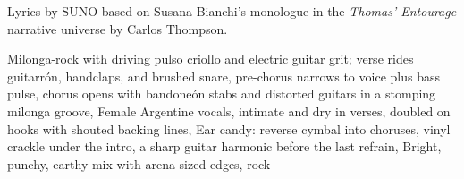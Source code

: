 
\begin{notes}
Lyrics by SUNO based on Susana Bianchi's monologue in the \emph{Thomas’ Entourage} narrative universe by Carlos Thompson.
\end{notes}
\begin{style}
Milonga-rock with driving pulso criollo and electric guitar grit; verse rides guitarrón, handclaps, and brushed snare, pre-chorus narrows to voice plus bass pulse, chorus opens with bandoneón stabs and distorted guitars in a stomping milonga groove, Female Argentine vocals, intimate and dry in verses, doubled on hooks with shouted backing lines, Ear candy: reverse cymbal into choruses, vinyl crackle under the intro, a sharp guitar harmonic before the last refrain, Bright, punchy, earthy mix with arena-sized edges, rock
\end{style}
